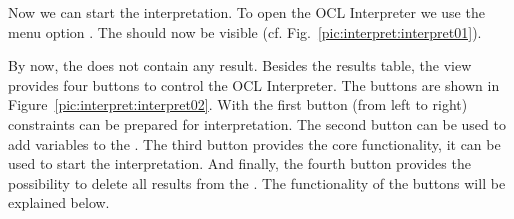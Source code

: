 Now we can start the interpretation. To open the \acs{OCL} Interpreter we use 
the menu option . The 
 should now be visible (cf. 
Fig.~\ref{pic:interpret:interpret01}).

By now, the  does not contain any result. Besides
the results table, the view provides four buttons to control the \acs{OCL} 
Interpreter. The buttons are shown in Figure~\ref{pic:interpret:interpret02}. 
With the first button (from left to right) constraints can be prepared for 
interpretation. The second button can be used to add variables to the 
. The third button provides the core 
functionality, it can be used to start the interpretation. And finally, the 
fourth button provides the possibility to delete all results from the 
. The functionality of the buttons will be 
explained below.

